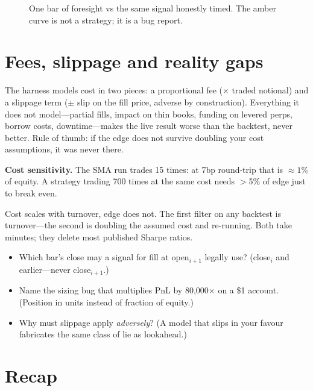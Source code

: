 \begin{figure}[htbp]\centering

\caption{One bar of foresight vs the same signal honestly timed. The amber curve is not a
strategy; it is a bug report.}
\label{fig:leakcurve}
\end{figure}

\section{Fees, slippage and reality gaps}\label{sec:btfrictions}

The harness models cost in two pieces: a proportional fee ($\times$ traded notional) and a
slippage term ($\pm$ slip on the fill price, adverse by construction). Everything it does
not model---partial fills, impact on thin books, funding on levered perps, borrow costs,
downtime---makes the live result worse than the backtest, never better. Rule of thumb: if
the edge does not survive doubling your cost assumptions, it was never there.

\begin{example}\label{ex:costs}
\textbf{Cost sensitivity.} The SMA run trades 15 times: at 7bp round-trip that is
$\approx1\%$ of equity. A strategy trading 700 times at the same cost needs $>$5\% of edge
just to break even.
\begin{solution}
Cost scales with turnover, edge does not. The first filter on any backtest is
turnover---the second is doubling the assumed cost and re-running. Both take minutes;
they delete most published Sharpe ratios.
\end{solution}
\end{example}

\begin{checkpoint}
\begin{itemize}
\item Which bar's close may a signal for fill at open$_{i+1}$ legally use? (close$_i$ and
earlier---never close$_{i+1}$.)
\item Name the sizing bug that multiplies PnL by 80{,}000$\times$ on a \$1 account. (Position
in units instead of fraction of equity.)
\item Why must slippage apply \emph{adversely}? (A model that slips in your favour
fabricates the same class of lie as lookahead.)
\end{itemize}
\end{checkpoint}

\section{Recap}\label{sec:btrecap}

